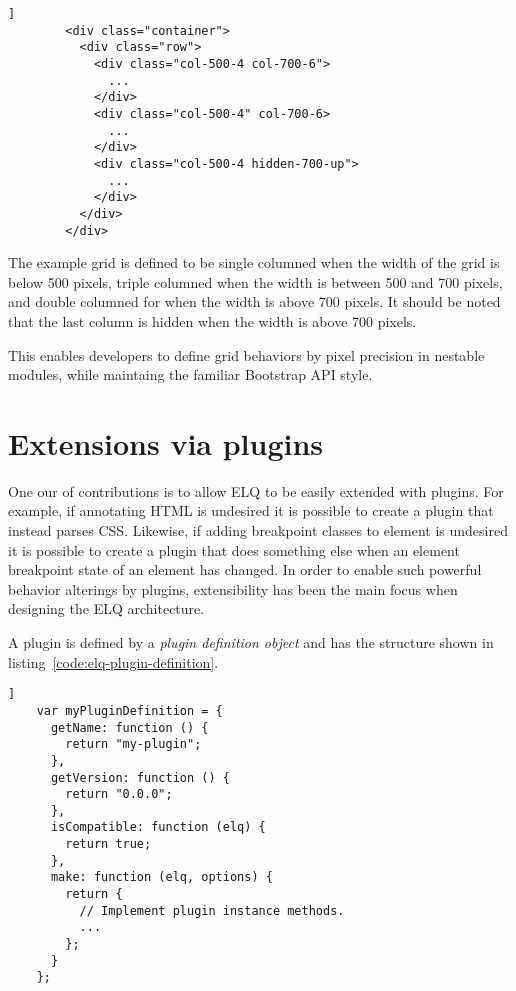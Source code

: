 \documentclass{acm_proc_article-sp}
\newcommand{\elq}{ELQ}
\begin{document}
      \begin{lstlisting}[gobble=8,caption={},captionpos=b,label={}]]
        <div class="container">
          <div class="row">
            <div class="col-500-4 col-700-6">
              ...
            </div>
            <div class="col-500-4" col-700-6>
              ...
            </div>
            <div class="col-500-4 hidden-700-up">
              ...
            </div>
          </div>
        </div>
      \end{lstlisting}

      The example grid is defined to be single columned when the width of the grid is below 500 pixels, triple columned when the width is between 500 and 700 pixels, and double columned for when the width is above 700 pixels.
      It should be noted that the last column is hidden when the width is above 700 pixels.

      This enables developers to define grid behaviors by pixel precision in nestable modules, while maintaing the familiar Bootstrap API style.

\section{Extensions via plugins}
  One our of contributions is to allow \elq{} to be easily extended with plugins.
  For example, if annotating HTML is undesired it is possible to create a plugin that instead parses CSS.
  Likewise, if adding breakpoint classes to element is undesired it is possible to create a plugin that does something else when an element breakpoint state of an element has changed.
  In order to enable such powerful behavior alterings by plugins, extensibility has been the main focus when designing the \elq{} architecture.

  A plugin is defined by a \emph{plugin definition object} and has the structure shown in listing~\ref{code:elq-plugin-definition}.
  \begin{lstlisting}[gobble=4,caption={The structure of plugin definition objects.},captionpos=b,label={code:elq-plugin-definition}]]
    var myPluginDefinition = {
      getName: function () {
        return "my-plugin";
      },
      getVersion: function () {
        return "0.0.0";
      },
      isCompatible: function (elq) {
        return true;
      },
      make: function (elq, options) {
        return {
          // Implement plugin instance methods.
          ...
        };
      }
    };
  \end{lstlisting}
\end{document}
